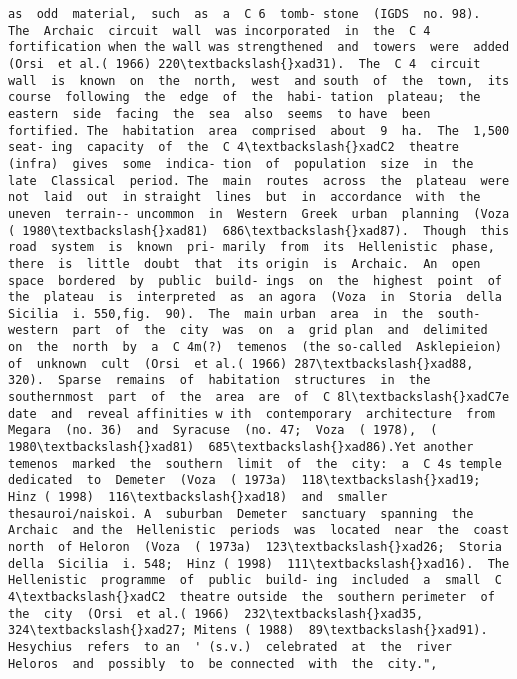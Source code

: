 \documentclass[11pt]{article}
\begin{document}
\begin{Verbatim}[commandchars=\\\{\}]
as  odd  material,  such  as  a  C 6  tomb- stone  (IGDS  no. 98).  The  Archaic  circuit  wall  was incorporated  in  the  C 4  fortification when the wall was strengthened  and  towers  were  added  (Orsi  et al.( 1966) 220\textbackslash{}xad31).  The  C 4  circuit  wall  is  known  on  the  north,  west  and south  of  the  town,  its  course  following  the  edge  of  the  habi- tation  plateau;  the  eastern  side  facing  the  sea  also  seems  to have  been  fortified. The  habitation  area  comprised  about  9  ha.  The  1,500  seat- ing  capacity  of  the  C 4\textbackslash{}xadC2  theatre  (infra)  gives  some  indica- tion  of  population  size  in  the  late  Classical  period. The  main  routes  across  the  plateau  were  not  laid  out  in straight  lines  but  in  accordance  with  the  uneven  terrain-- uncommon  in  Western  Greek  urban  planning  (Voza ( 1980\textbackslash{}xad81)  686\textbackslash{}xad87).  Though  this  road  system  is  known  pri- marily  from  its  Hellenistic  phase,  there  is  little  doubt  that  its origin  is  Archaic.  An  open  space  bordered  by  public  build- ings  on  the  highest  point  of  the  plateau  is  interpreted  as  an agora  (Voza  in  Storia  della  Sicilia  i. 550,fig.  90).  The  main urban  area  in  the  south-western  part  of  the  city  was  on  a  grid plan  and  delimited  on  the  north  by  a  C 4m(?)  temenos  (the so-called  Asklepieion)  of  unknown  cult  (Orsi  et al.( 1966) 287\textbackslash{}xad88,  320).  Sparse  remains  of  habitation  structures  in  the southernmost  part  of  the  area  are  of  C 8l\textbackslash{}xadC7e  date  and  reveal affinities w ith  contemporary  architecture  from  Megara  (no. 36)  and  Syracuse  (no. 47;  Voza  ( 1978),  ( 1980\textbackslash{}xad81)  685\textbackslash{}xad86).Yet another  temenos  marked  the  southern  limit  of  the  city:  a  C 4s temple  dedicated  to  Demeter  (Voza  ( 1973a)  118\textbackslash{}xad19;  Hinz ( 1998)  116\textbackslash{}xad18)  and  smaller  thesauroi/naiskoi. A  suburban  Demeter  sanctuary  spanning  the  Archaic  and the  Hellenistic  periods  was  located  near  the  coast  north  of Heloron  (Voza  ( 1973a)  123\textbackslash{}xad26;  Storia  della  Sicilia  i. 548;  Hinz ( 1998)  111\textbackslash{}xad16).  The  Hellenistic  programme  of  public  build- ing  included  a  small  C 4\textbackslash{}xadC2  theatre outside  the  southern perimeter  of  the  city  (Orsi  et al.( 1966)  232\textbackslash{}xad35,  324\textbackslash{}xad27; Mitens ( 1988)  89\textbackslash{}xad91).  Hesychius  refers  to an  ' (s.v.)  celebrated  at  the  river  Heloros  and  possibly  to  be connected  with  the  city.",

\end{Verbatim}
\end{document}
